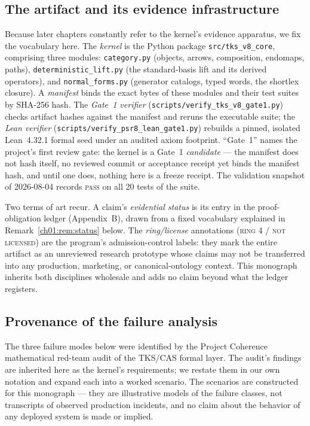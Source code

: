 \subsection{The artifact and its evidence infrastructure}

Because later chapters constantly refer to the kernel's evidence
apparatus, we fix the vocabulary here. The \emph{kernel} is the Python
package \texttt{src/tks\_v8\_core}, comprising three modules:
\texttt{category.py} (objects, arrows, composition, endomaps, paths),
\texttt{deterministic\_lift.py} (the standard-basis lift and its derived
operators), and \texttt{normal\_forms.py} (generator catalogs, typed
words, the shortlex closure). A \emph{manifest} binds the exact bytes of
these modules and their test suites by SHA-256 hash. The \emph{Gate~1
verifier} (\texttt{scripts/verify\_tks\_v8\_gate1.py}) checks artifact
hashes against the manifest and reruns the executable suite; the
\emph{Lean verifier} (\texttt{scripts/verify\_psr8\_lean\_gate1.py})
rebuilds a pinned, isolated Lean~4.32.1 formal seed \cite{lean4} under an
audited axiom footprint. ``Gate~1'' names the project's first review
gate: the kernel is a Gate~1 \emph{candidate} --- the manifest does not
hash itself, no reviewed commit or acceptance receipt yet binds the
manifest hash, and until one does, nothing here is a freeze receipt.
The validation snapshot of 2026-08-04 records \textsc{pass} on all 20
tests of the suite.

Two terms of art recur. A claim's \emph{evidential status} is its entry
in the proof-obligation ledger (Appendix~B), drawn from a fixed
vocabulary explained in Remark~\ref{ch01:rem:status} below. The
\emph{ring/license} annotations (\textsc{ring 4 / not licensed}) are the
program's admission-control labels: they mark the entire artifact as an
unreviewed research prototype whose claims may not be transferred into
any production, marketing, or canonical-ontology context. This
monograph inherits both disciplines wholesale and adds no claim beyond
what the ledger registers.

\subsection{Provenance of the failure analysis}

The three failure modes below were identified by the Project Coherence
mathematical red-team audit of the TKS/CAS formal layer. The audit's findings
are inherited here as the kernel's requirements; we restate them in our own
notation and expand each into a worked scenario. The scenarios are
constructed for this monograph --- they are illustrative models of the failure
classes, not transcripts of observed production incidents, and no claim about
the behavior of any deployed system is made or implied.

